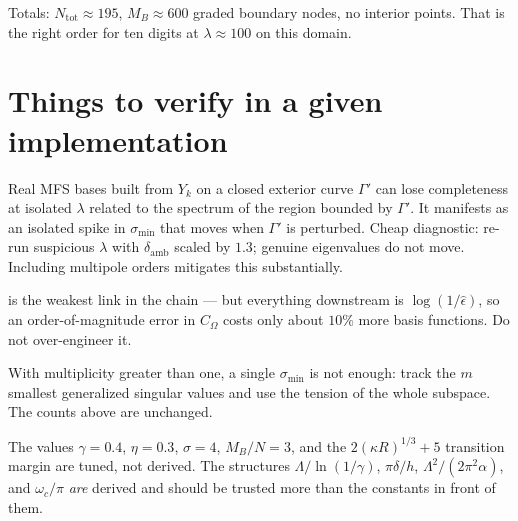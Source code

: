 \documentclass[11pt]{article}
\begin{document}
\noindent
Totals: $N_{\mathrm{tot}}\approx 195$, $M_B\approx600$ graded boundary nodes, no
interior points. That is the right order for ten digits at $\lambda\approx100$ on this
domain.

\section{Things to verify in a given implementation}
\label{sec:caveats}

\begin{description}[leftmargin=2.2em,style=nextline]
\item[Source-curve resonance.]
  Real MFS bases built from $Y_k$ on a closed exterior curve $\Gamma'$ can lose
  completeness at isolated $\lambda$ related to the spectrum of the region bounded by
  $\Gamma'$. It manifests as an isolated spike in $\sigma_{\min}$ that moves when
  $\Gamma'$ is perturbed. Cheap diagnostic: re-run suspicious $\lambda$ with
  $\delta_{\mathrm{amb}}$ scaled by $1.3$; genuine eigenvalues do not move. Including
  multipole orders mitigates this substantially.
\item[$C_\Omega$ calibration]
  is the weakest link in the chain --- but everything downstream is
  $\log(1/\hat\epsilon)$, so an order-of-magnitude error in $C_\Omega$ costs only
  about $10\%$ more basis functions. Do not over-engineer it.
\item[Degeneracies.]
  With multiplicity greater than one, a single $\sigma_{\min}$ is not enough: track
  the $m$ smallest generalized singular values and use the tension of the whole
  subspace. The counts above are unchanged.
\item[Tuned versus derived constants.]
  The values $\gamma=0.4$, $\eta=0.3$, $\sigma=4$, $M_B/N=3$, and the
  $2(\kappa R)^{1/3}+5$ transition margin are tuned, not derived. The structures
  $\Lambda/\ln(1/\gamma)$, $\pi\delta/h$, $\Lambda^2/(2\pi^2\alpha)$, and
  $\omega_c/\pi$ \emph{are} derived and should be trusted more than the constants in
  front of them.
\end{description}
\end{document}
